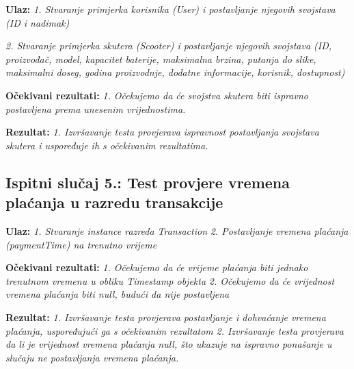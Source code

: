                                                             \textbf{Ulaz:}
                                                            \textit{1. Stvaranje primjerka korisnika (User) i postavljanje njegovih svojstava (ID i nadimak)}

                                                            \textit{2. Stvaranje primjerka skutera (Scooter) i postavljanje njegovih svojstava (ID, proizvođač, model, kapacitet baterije, maksimalna brzina, putanja do slike, maksimalni doseg, godina proizvodnje, dodatne informacije, korisnik, dostupnost)}

                                                            \textbf{Očekivani rezultati:}
                                                            \textit{1. Očekujemo da će svojstva skutera biti ispravno postavljena prema unesenim vrijednostima.}

                                                            \textbf{Rezultat:}
                                                            \textit{1. Izvršavanje testa provjerava ispravnost postavljanja svojstava skutera i uspoređuje ih s očekivanim rezultatima.}

			\subsection{Ispitni slučaj 5.: Test provjere vremena plaćanja u razredu transakcije}

                                                                        \textbf{Ulaz:}
                                                                        \textit{1. Stvaranje instance razreda Transaction}
                                                                        \textit{2. Postavljanje vremena plaćanja (paymentTime) na trenutno vrijeme}

                                                                        \textbf{Očekivani rezultati:}
                                                                        \textit{1. Očekujemo da će vrijeme plaćanja biti jednako trenutnom vremenu u obliku Timestamp objekta}
                                                                        \textit{2. Očekujemo da će vrijednost vremena plaćanja biti null, budući da nije postavljena}


                                                                        \textbf{Rezultat:}
                                                                        \textit{1. Izvršavanje testa provjerava postavljanje i dohvaćanje vremena plaćanja, uspoređujući ga s očekivanim rezultatom}
                                                                        \textit{2. Izvršavanje testa provjerava da li je vrijednost vremena plaćanja null, što ukazuje na ispravno ponašanje u slučaju ne postavljanja vremena plaćanja.}




